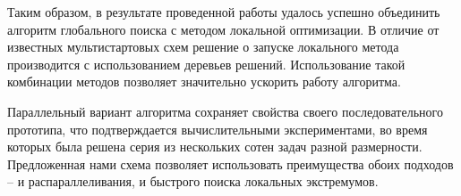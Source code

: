 \documentclass{svproc}
\begin{document}

Таким образом, в результате проведенной работы удалось успешно объединить алгоритм глобального поиска с методом локальной оптимизации. 
В отличие от известных мультистартовых схем решение о запуске локального метода производится с использованием деревьев решений.
Использование такой комбинации методов позволяет значительно ускорить работу алгоритма. 

Параллельный вариант алгоритма сохраняет свойства своего последовательного прототипа, что подтверждается вычислительными экспериментами, во время которых была решена серия из нескольких сотен задач разной размерности. Предложенная нами схема позволяет использовать преимущества обоих подходов -- и распараллеливания, и быстрого поиска локальных экстремумов.
\end{document}
